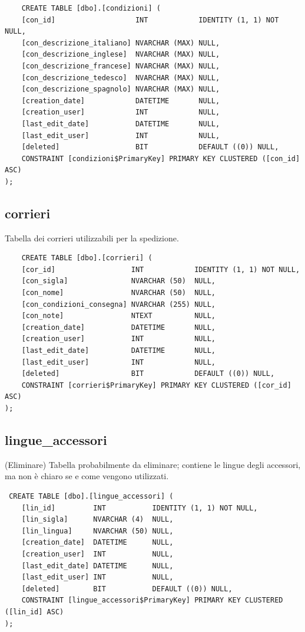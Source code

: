 \documentclass[12pt]{article}
\begin{document}
\begin{lstlisting}
    CREATE TABLE [dbo].[condizioni] (
    [con_id]                   INT            IDENTITY (1, 1) NOT NULL,
    [con_descrizione_italiano] NVARCHAR (MAX) NULL,
    [con_descrizione_inglese]  NVARCHAR (MAX) NULL,
    [con_descrizione_francese] NVARCHAR (MAX) NULL,
    [con_descrizione_tedesco]  NVARCHAR (MAX) NULL,
    [con_descrizione_spagnolo] NVARCHAR (MAX) NULL,
    [creation_date]            DATETIME       NULL,
    [creation_user]            INT            NULL,
    [last_edit_date]           DATETIME       NULL,
    [last_edit_user]           INT            NULL,
    [deleted]                  BIT            DEFAULT ((0)) NULL,
    CONSTRAINT [condizioni$PrimaryKey] PRIMARY KEY CLUSTERED ([con_id] ASC)
);
\end{lstlisting}

\subsection{corrieri}
Tabella dei corrieri utilizzabili per la spedizione.
\begin{lstlisting}
    CREATE TABLE [dbo].[corrieri] (
    [cor_id]                  INT            IDENTITY (1, 1) NOT NULL,
    [con_sigla]               NVARCHAR (50)  NULL,
    [con_nome]                NVARCHAR (50)  NULL,
    [con_condizioni_consegna] NVARCHAR (255) NULL,
    [con_note]                NTEXT          NULL,
    [creation_date]           DATETIME       NULL,
    [creation_user]           INT            NULL,
    [last_edit_date]          DATETIME       NULL,
    [last_edit_user]          INT            NULL,
    [deleted]                 BIT            DEFAULT ((0)) NULL,
    CONSTRAINT [corrieri$PrimaryKey] PRIMARY KEY CLUSTERED ([cor_id] ASC)
);

\end{lstlisting}

\subsection{lingue\_accessori}(Eliminare)
Tabella probabilmente da eliminare; contiene le lingue degli accessori, ma non è chiaro se e come vengono utilizzati.
\begin{lstlisting}
 CREATE TABLE [dbo].[lingue_accessori] (
    [lin_id]         INT           IDENTITY (1, 1) NOT NULL,
    [lin_sigla]      NVARCHAR (4)  NULL,
    [lin_lingua]     NVARCHAR (50) NULL,
    [creation_date]  DATETIME      NULL,
    [creation_user]  INT           NULL,
    [last_edit_date] DATETIME      NULL,
    [last_edit_user] INT           NULL,
    [deleted]        BIT           DEFAULT ((0)) NULL,
    CONSTRAINT [lingue_accessori$PrimaryKey] PRIMARY KEY CLUSTERED ([lin_id] ASC)
);

\end{lstlisting}
\end{document}
